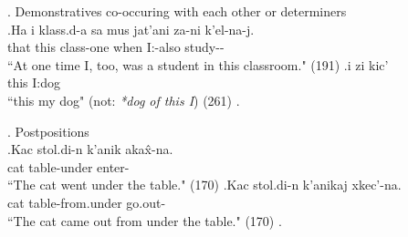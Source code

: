     
\ex. Demonstratives co-occuring with each other or determiners \\
    \ag.\label{sent:ex6a}Ha i klass.d-a sa mus jat'ani za-ni k'el-na-j. \\
    that this class-\Inessc[] one when \Indf[] I:\Erg[]-also study-\Aori[]-\Pst[] \\
    ``At one time I, too, was a student in this classroom." (191)
    \bg.\label{sent:ex6b}i zi kic' \\
    this I:\Gen[] dog \\
    ``this my dog" (not: \textit{*dog of this I}) (261)
    \z.

\ex. \label{sent:ex3}Postpositions\\
    \ag.\label{sent:ex3a}Kac stol.di-n k'anik aka\^{x}-na. \\
        cat table-\Gen[] under enter-\Aori[] \\
        ``The cat went under the table." (170) 
    \bg.\label{sent:ex3b}Kac stol.di-n k'anikaj xkec'-na. \\
        cat table-\Gen[] from.under go.out-\Aori[] \\
        ``The cat came out from under the table." (170)
    \z.

